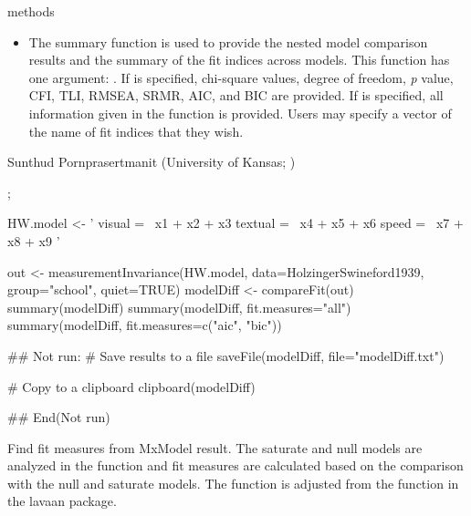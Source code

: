 \documentclass[a4paper]{book}
\begin{document}
%
\begin{Section}{methods}
\begin{itemize}

\item {} The summary function is used to provide the nested model comparison results and the summary of the fit indices across models. This function has one argument: . If  is specified, chi-square values, degree of freedom, \emph{p} value, CFI, TLI, RMSEA, SRMR, AIC, and BIC are provided. If  is specified, all information given in the  function is provided. Users may specify a vector of the name of fit indices that they wish. 

\end{itemize}

\end{Section}
%
\begin{Author}\relax
Sunthud Pornprasertmanit (University of Kansas; )
\end{Author}
%
\begin{SeeAlso}\relax
{}; 
\end{SeeAlso}
%
\begin{Examples}
\begin{ExampleCode}
HW.model <- ' visual =~ x1 + x2 + x3
              textual =~ x4 + x5 + x6
              speed =~ x7 + x8 + x9 '

out <- measurementInvariance(HW.model, data=HolzingerSwineford1939, group="school", quiet=TRUE)
modelDiff <- compareFit(out)
summary(modelDiff)
summary(modelDiff, fit.measures="all")
summary(modelDiff, fit.measures=c("aic", "bic"))

## Not run: 
# Save results to a file 
saveFile(modelDiff, file="modelDiff.txt")

# Copy to a clipboard
clipboard(modelDiff)

## End(Not run)
\end{ExampleCode}
\end{Examples}
%
\begin{Description}\relax
Find fit measures from MxModel result. The saturate and null models are analyzed in the function and fit measures are calculated based on the comparison with the null and saturate models. The function is adjusted from the  function in the lavaan package.
\end{Description}
\end{document}
